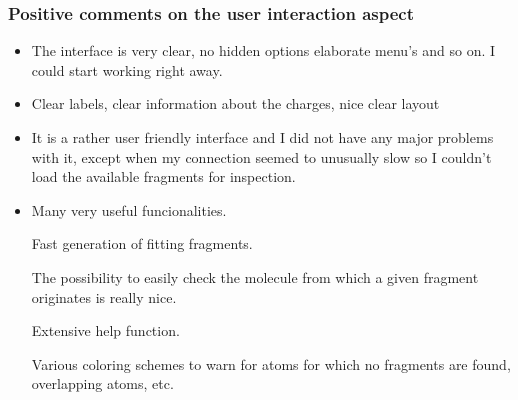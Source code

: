 \subsubsection{Positive comments on the user interaction aspect}
\begin{itemize}
\item The interface is very clear, no hidden options elaborate menu's and so on. I could start working right away.

\item Clear labels, clear information about the charges, nice clear layout

\item It is a rather user friendly interface and I did not have any major problems with it, except when my connection seemed to unusually slow so I couldn't load the available fragments for inspection.

\item Many very useful funcionalities.

Fast generation of fitting fragments.

The possibility to easily check the molecule from which a given fragment originates is really nice.

Extensive help function.

Various coloring schemes to warn for atoms for which no fragments are found, overlapping atoms, etc.

\end{itemize}


